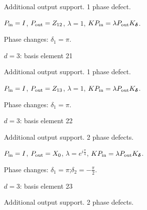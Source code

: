 Additional output support. 1 phase defect.
\begin{center}
\end{center}
\vspace{-1mm}
$P_{\rm in}=I$, \quad $P_{\rm out}=Z_{12}$, \quad $\lambda=1$, \qquad $K P_{\rm in}=\lambda P_{\rm out}K_{\boldsymbol\delta}$.
\par\smallskip\begin{minipage}{.98\linewidth}\small Phase changes: $\delta_{1}=\pi$.\end{minipage}
\vfill
{\footnotesize\texttt{}}
\newpage
{}
{\Large $d=3$: basis element 21}\par
Additional output support. 1 phase defect.
\begin{center}
\end{center}
\vspace{-1mm}
$P_{\rm in}=I$, \quad $P_{\rm out}=Z_{13}$, \quad $\lambda=1$, \qquad $K P_{\rm in}=\lambda P_{\rm out}K_{\boldsymbol\delta}$.
\par\smallskip\begin{minipage}{.98\linewidth}\small Phase changes: $\delta_{1}=\pi$.\end{minipage}
\vfill
{\footnotesize\texttt{}}
\newpage
{}
{\Large $d=3$: basis element 22}\par
Additional output support. 2 phase defects.
\begin{center}
\end{center}
\vspace{-1mm}
$P_{\rm in}=I$, \quad $P_{\rm out}=X_{0}$, \quad $\lambda=e^{i\frac{\pi}{4}}$, \qquad $K P_{\rm in}=\lambda P_{\rm out}K_{\boldsymbol\delta}$.
\par\smallskip\begin{minipage}{.98\linewidth}\small Phase changes: $\delta_{1}=\pi$;\quad $\delta_{2}=-\frac{\pi}{2}$.\end{minipage}
\vfill
{\footnotesize\texttt{}}
\newpage
{}
{\Large $d=3$: basis element 23}\par
Additional output support. 2 phase defects.
\begin{center}
\end{center}
